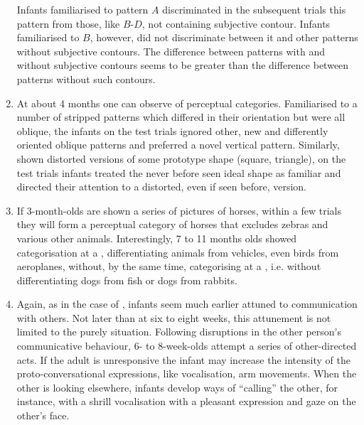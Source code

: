 \begin{enumerate}
\begin{center}
\end{center}
Infants familiarised to pattern $A$ discriminated in the subsequent trials this
pattern from those, like $B$-$D$, not containing subjective contour.  Infants
familiarised to $B$, however, did not discriminate between it and other patterns
without subjective contours. The difference between patterns with and without
subjective contours seems to be greater than the difference between patterns
without such contours.
\item At about 4 months one can observe  of perceptual
  categories. Familiarised to a number of stripped patterns which differed in
  their orientation but were all oblique, the infants on the test trials
  ignored other, new and differently oriented oblique patterns and preferred a
  novel vertical pattern. Similarly, shown distorted versions
  of some prototype shape (square, triangle), on the test trials infants treated
  the never before seen ideal shape as familiar and directed their attention to
  a distorted, even if seen before, version.
\item If 3-month-olds are shown a series of pictures of horses, within a few
  trials they will form a perceptual category of horses that excludes zebras and
  various other animals. Interestingly, 7 to 11 months olds
  showed categorisation at a , differentiating animals from
  vehicles, even birds from aeroplanes, without, by the same time, categorising
  at a , i.e. without differentiating dogs from fish or
  dogs from rabbits.
\item Again, as in the case of , infants seem much earlier
  attuned to communication with others.  Not later than at six to eight weeks,
  this attunement is not limited to the purely  situation.  Following
  disruptions in the other person's communicative behaviour, 6- to 8-week-olds
  attempt a series of other-directed acts. If the adult is unresponsive the
  infant may increase the intensity of the proto-conversational expressions,
  like vocalisation, arm movements. When the other is looking elsewhere, infants
  develop ways of ``calling'' the other, for instance, with a shrill
  vocalisation with a pleasant expression and gaze on the other's
  face.
\end{enumerate}

